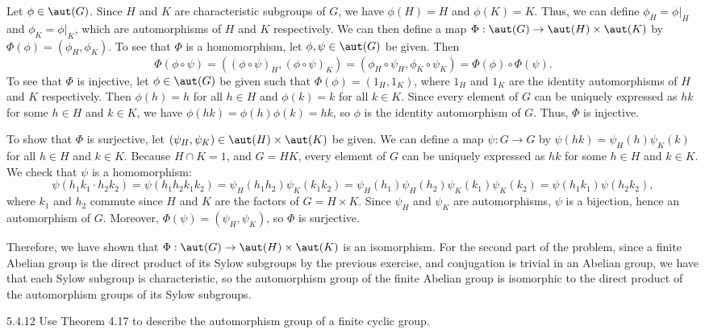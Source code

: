 \begin{sol}[spsol]
    Let $\phi \in \aut(G)$.
	Since $H$ and $K$ are characteristic subgroups of $G$, we have $\phi(H) = H$ and $\phi(K) = K$.
	Thus, we can define $\phi_H = \phi|_H$ and $\phi_K = \phi|_K$, which are automorphisms of $H$ and $K$ respectively.
	We can then define a map $\Phi: \aut(G) \to \aut(H) \times \aut(K)$ by $\Phi(\phi) = (\phi_H, \phi_K)$.
	To see that $\Phi$ is a homomorphism, let $\phi, \psi \in \aut(G)$ be given.
	Then
    \[
    	\Phi(\phi \circ \psi) = ((\phi \circ \psi)_H, (\phi \circ \psi)_K) = (\phi_H \circ \psi_H, \phi_K \circ \psi_K) = \Phi(\phi) \circ \Phi(\psi).
    \]
    To see that $\Phi$ is injective, let $\phi \in \aut(G)$ be given such that $\Phi(\phi) = (1_H, 1_K)$, where $1_H$ and $1_K$ are the identity automorphisms of $H$ and $K$ respectively.
	Then $\phi(h) = h$ for all $h \in H$ and $\phi(k) = k$ for all $k \in K$.
	Since every element of $G$ can be uniquely expressed as $hk$ for some $h \in H$ and $k \in K$, we have $\phi(hk) = \phi(h)\phi(k) = hk$, so $\phi$ is the identity automorphism of $G$.
	Thus, $\Phi$ is injective.

    To show that $\Phi$ is surjective, let $(\psi_H, \psi_K) \in \aut(H) \times \aut(K)$ be given.
	We can define a map $\psi: G \to G$ by $\psi(hk) = \psi_H(h)\psi_K(k)$ for all $h \in H$ and $k \in K$.
	Because $H \cap K = 1$, and $G = HK$, every element of $G$ can be uniquely expressed as $hk$ for some $h \in H$ and $k \in K$.
	We check that $\psi$ is a homomorphism:
    \[
    	\psi(h_1k_1 \cdot h_2k_2) = \psi(h_1h_2k_1k_2) = \psi_H(h_1h_2)\psi_K(k_1k_2) = \psi_H(h_1)\psi_H(h_2)\psi_K(k_1)\psi_K(k_2) = \psi(h_1k_1)\psi(h_2k_2),
    \]
    where $k_1$ and $h_2$ commute since $H$ and $K$ are the factors of $G = H \times K$.
	Since $\psi_H$ and $\psi_K$ are automorphisms, $\psi$ is a bijection, hence an automorphism of $G$.
	Moreover, $\Phi(\psi) = (\psi_H, \psi_K)$, so $\Phi$ is surjective.

    Therefore, we have shown that $\Phi: \aut(G) \to \aut(H) \times \aut(K)$ is an isomorphism.
	For the second part of the problem, since a finite Abelian group is the direct product of its Sylow subgroups by the previous exercise, and conjugation is trivial in an Abelian group, we have that each Sylow subgroup is characteristic, so the automorphism group of the finite Abelian group is isomorphic to the direct product of the automorphism groups of its Sylow subgroups.
\end{sol}

\begin{exercise}{5.4.12}
    Use Theorem 4.17 to describe the automorphism group of a finite cyclic group.
\end{exercise}

